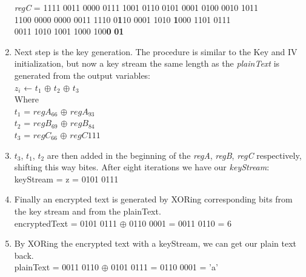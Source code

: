 \begin{enumerate}
{		\emph{regC} = 1111 0011 0000 0111 1001 0110 0101 0001 0100 0010 1011 \\ 
		\indent\hspace{1.6cm}1100 0000 0000 0011 1110 0\textbf{1}10 0001 1010 \textbf{1}000 1101 0111 \\
		\indent\hspace{1.6cm}0011 1010 1001 1000 100\textbf{0} \textbf{01}
	}
	\item Next step is the key generation. The procedure is similar to the Key and IV initialization, but now a key stream the same length as the \emph{plainText} is generated from the output variables:\\
	{\selectfont
		$z_i$ ← $t_1$ $\oplus$ $t_2$ $\oplus$ $t_3$\\
		Where \\
		$t_1$ = $regA_{66}$ $\oplus$ $regA_{93}$\\
		$t_2$ = $regB_{69}$ $\oplus$ $regB_{84}$\\
		$t_3$ = $regC_{66}$ $\oplus$ $regC{111}$
	}
	\item \emph{$t_3$}, \emph{$t_1$}, \emph{$t_2$} are then added in the beginning of the \emph{regA}, \emph{regB}, \emph{regC} respectively, shifting this way bites. After eight iterations we have our \emph{keyStream}:\\
	{\selectfont
		keyStream  = z = 0101 0111
	}
	\item Finally an encrypted text is generated by XORing corresponding bits from the key stream and from the plainText.\\
	{\selectfont
		encryptedText = 0101 0111 $\oplus$ 0110 0001 = 0011 0110 = 6
	}
	\item By XORing the encrypted text with a keyStream, we can get our plain text back.\\
	{\selectfont
		plainText = 0011 0110 $\oplus$ 0101 0111 = 0110 0001 = 'a'
	}
\end{enumerate}

